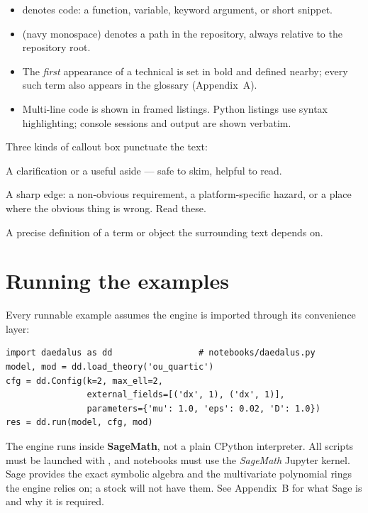 \begin{itemize}[nosep]
  \item {} denotes code: a function, variable, keyword
        argument, or short snippet.
  \item {} (navy monospace) denotes a path in the
        repository, always relative to the repository root.
  \item The \emph{first} appearance of a technical  is set in bold
        and defined nearby; every such term also appears in the glossary
        (Appendix~A).
  \item Multi-line code is shown in framed listings.  Python listings use
        syntax highlighting; console sessions and output are shown verbatim.
\end{itemize}

Three kinds of callout box punctuate the text:

\begin{note}
A clarification or a useful aside --- safe to skim, helpful to read.
\end{note}

\begin{gotcha}
A sharp edge: a non-obvious requirement, a platform-specific hazard, or a place
where the obvious thing is wrong.  Read these.
\end{gotcha}

\begin{defn}
A precise definition of a term or object the surrounding text depends on.
\end{defn}

\section*{Running the examples}

Every runnable example assumes the engine is imported through its convenience
layer:

\begin{lstlisting}
import daedalus as dd                 # notebooks/daedalus.py
model, mod = dd.load_theory('ou_quartic')
cfg = dd.Config(k=2, max_ell=2,
                external_fields=[('dx', 1), ('dx', 1)],
                parameters={'mu': 1.0, 'eps': 0.02, 'D': 1.0})
res = dd.run(model, cfg, mod)
\end{lstlisting}

\begin{gotcha}
The engine runs inside \textbf{SageMath}, not a plain CPython interpreter.  All
scripts must be launched with , and notebooks
must use the \emph{SageMath} Jupyter kernel.  Sage provides the exact symbolic
algebra and the multivariate polynomial rings the engine relies on; a stock
 will not have them.  See Appendix~B for what Sage is and why it is
required.
\end{gotcha}

